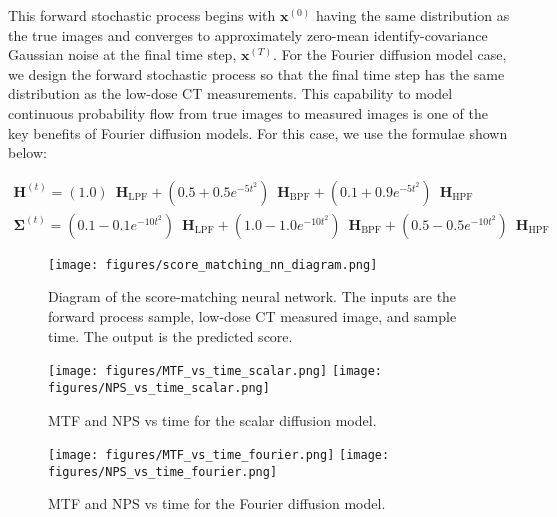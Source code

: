 \documentclass[12pt,]{article}
\begin{document}
\noindent This forward stochastic process begins with $\mathbf{x}^{(0)}$ having the same distribution as the true images and converges to approximately zero-mean identify-covariance Gaussian noise at the final time step, $\mathbf{x}^{(T)}$. For the Fourier diffusion model case, we design the forward stochastic process so that the final time step has the same distribution as the low-dose CT measurements. This capability to model continuous probability flow from true images to measured images is one of the key benefits of Fourier diffusion models. For this case, we use the formulae shown below:

\begin{gather}
    \mathbf{H}^{(t)} = (1.0) \enspace \mathbf{H}_\text{LPF}  + (0.5 + 0.5e^{-5t^2}) \enspace \mathbf{H}_\text{BPF}  + (0.1 + 0.9e^{-5t^2}) \enspace \mathbf{H}_\text{HPF} \\ 
    \boldsymbol{\Sigma}^{(t)} = (0.1 - 0.1 e^{- 10 t^2}) \enspace \mathbf{H}_\text{LPF}  + (1.0 - 1.0 e^{- 10 t^2}) \enspace \mathbf{H}_\text{BPF}  + (0.5 - 0.5 e^{- 10 t^2}) \enspace \mathbf{H}_\text{HPF}  
\end{gather}


\begin{figure}
    \centering
    \texttt{[image: figures/score\_matching\_nn\_diagram.png]}
    \caption{Diagram of the score-matching neural network. The inputs are the forward process sample, low-dose CT measured image, and sample time. The output is the predicted score.  }
    \label{fig:unet_diagram}
\end{figure}

\begin{figure}[h!]
    \centering
\texttt{[image: figures/MTF\_vs\_time\_scalar.png]}
\texttt{[image: figures/NPS\_vs\_time\_scalar.png]}
    \caption{MTF  and NPS vs time for the scalar diffusion model. }
    \label{fig:MTF_NPS_vs_time_scalar}
\end{figure}


\begin{figure}[h!]
    \centering
\texttt{[image: figures/MTF\_vs\_time\_fourier.png]}
\texttt{[image: figures/NPS\_vs\_time\_fourier.png]}
    \caption{MTF and NPS vs time for the Fourier diffusion model. }
    \label{fig:MTF_NPS_vs_time_fourier}
\end{figure}
\end{document}
